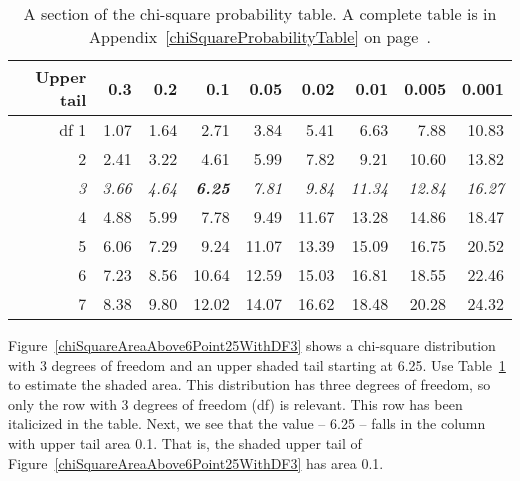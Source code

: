 \begin{table}[h]
\centering
\begin{tabular}{r | rrrr | rrrr |}
  \hline
Upper tail & 0.3 & 0.2 & 0.1 & 0.05 & 0.02 & 0.01 & 0.005 & 0.001 \\ 
  \hline
df \hfill 1 & \footnotesize 1.07 & \footnotesize 1.64 & \footnotesize 2.71 & \footnotesize 3.84 & \footnotesize 5.41 & \footnotesize 6.63 & \footnotesize 7.88 & \footnotesize 10.83 \\ 
  2 & \footnotesize 2.41 & \footnotesize \color{tableHLBlue} 3.22 & \footnotesize \color{tableHLBlue} 4.61 & \footnotesize 5.99 & \footnotesize 7.82 & \footnotesize 9.21 & \footnotesize 10.60 & \footnotesize 13.82 \\ 
  \em3 & \em\footnotesize 3.66 & \em\footnotesize 4.64 & \em\footnotesize \textbf{\color{highlight}6.25} & \em\footnotesize 7.81 & \em\footnotesize 9.84 & \em\footnotesize 11.34 & \em\footnotesize 12.84 & \em\footnotesize 16.27 \\ 
  4 & \footnotesize 4.88 & \footnotesize 5.99 & \footnotesize 7.78 & \footnotesize 9.49 & \footnotesize 11.67 & \footnotesize 13.28 & \footnotesize 14.86 & \footnotesize 18.47 \\ 
  5 & \footnotesize 6.06 & \footnotesize 7.29 & \footnotesize 9.24 & \footnotesize 11.07 & \footnotesize 13.39 & \footnotesize 15.09 & \footnotesize 16.75 & \footnotesize 20.52 \\ 
  \hline
  6 & \footnotesize 7.23 & \footnotesize 8.56 & \footnotesize 10.64 & \footnotesize 12.59 & \footnotesize 15.03 & \footnotesize 16.81 & \footnotesize 18.55 & \footnotesize 22.46 \\ 
  7 & \footnotesize 8.38 & \footnotesize 9.80 & \footnotesize 12.02 & \footnotesize 14.07 & \footnotesize 16.62 & \footnotesize 18.48 & \footnotesize 20.28 & \footnotesize 24.32 \\ 
  \hline
\end{tabular}
\caption{A section of the chi-square probability table. A complete table is in Appendix~\ref{chiSquareProbabilityTable} on page~\pageref{chiSquareProbabilityTable}.}
\label{chiSquareProbabilityTableShort}
\end{table}

\begin{example}{Figure~\ref{chiSquareAreaAbove6Point25WithDF3} shows a chi-square distribution with 3 degrees of freedom and an upper shaded tail starting at 6.25. Use Table~\ref{chiSquareProbabilityTableShort} to estimate the shaded area.}
This distribution has three degrees of freedom, so only the row with 3 degrees of freedom (df) is relevant. This row has been italicized in the table. Next, we see that the value -- 6.25 -- falls in the column with upper tail area 0.1. That is, the shaded upper tail of Figure~\ref{chiSquareAreaAbove6Point25WithDF3} has area 0.1.
\end{example}

